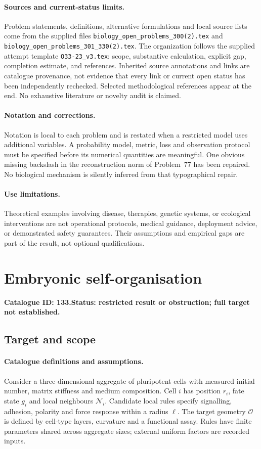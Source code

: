 \documentclass[11pt]{article}
\begin{document}
\paragraph{Sources and current-status limits.}
Problem statements, definitions, alternative formulations and local source lists
come from the supplied files
\texttt{biology\_open\_problems\_300(2).tex} and
\texttt{biology\_open\_problems\_301\_330(2).tex}.
The organization follows the supplied attempt template
\texttt{O33-23\_v3.tex}: scope, substantive calculation, explicit gap,
completion estimate, and references. Inherited source annotations and links are
catalogue provenance, not evidence that every link or current open status has
been independently rechecked. Selected methodological references appear at the
end. No exhaustive literature or novelty audit is claimed.

\paragraph{Notation and corrections.}
Notation is local to each problem and is restated when a restricted model uses
additional variables. A probability model, metric, loss and observation protocol
must be specified before its numerical quantities are meaningful. One obvious
missing backslash in the reconstruction norm of Problem~77 has been repaired.
No biological mechanism is silently inferred from that typographical repair.

\paragraph{Use limitations.}
Theoretical examples involving disease, therapies, genetic systems, or ecological
interventions are not operational protocols, medical guidance, deployment advice,
or demonstrated safety guarantees. Their assumptions and empirical gaps are part
of the result, not optional qualifications.

\setcounter{section}{132}
\section{Embryonic self-organisation}
\label{prob:133}
\noindent\textbf{Catalogue ID: 133.}\quad \textbf{Status: restricted result or obstruction; full target not established.}
\subsection{Target and scope}
\paragraph{Catalogue definitions and assumptions.}
Consider a three-dimensional aggregate of pluripotent cells with measured initial number, matrix stiffness and medium composition. Cell $i$ has position $r_i$, fate state $g_i$ and local neighbours $\mathcal N_i$. Candidate local rules specify signalling, adhesion, polarity and force response within a radius $\ell$. The target geometry $\mathcal O$ is defined by cell-type layers, curvature and a functional assay. Rules have finite parameters shared across aggregate sizes; external uniform factors are recorded inputs.
\end{document}
